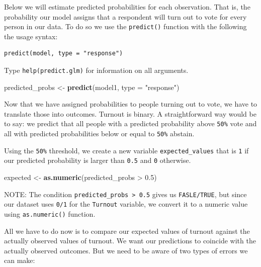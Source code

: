 \documentclass[]{article}
\newenvironment{Shaded}{\begin{snugshade}}{\end{snugshade}}
\newcommand{\KeywordTok}[1]{\textcolor[rgb]{0.13,0.29,0.53}{\textbf{{#1}}}}
\newcommand{\DataTypeTok}[1]{\textcolor[rgb]{0.13,0.29,0.53}{{#1}}}
\newcommand{\FloatTok}[1]{\textcolor[rgb]{0.00,0.00,0.81}{{#1}}}
\newcommand{\StringTok}[1]{\textcolor[rgb]{0.31,0.60,0.02}{{#1}}}
\newcommand{\NormalTok}[1]{{#1}}
\theoremstyle{definition}
\theoremstyle{definition}
\theoremstyle{remark}
\begin{document}
Below we will estimate predicted probabilities for each observation.
That is, the probability our model assigns that a respondent will turn
out to vote for every person in our data. To do so we use the
\texttt{predict()} function with the following the usage syntax:

\begin{verbatim}
predict(model, type = "response")
\end{verbatim}

Type \texttt{help(predict.glm)} for information on all arguments.

\begin{Shaded}
\begin{Highlighting}[]
\NormalTok{predicted_probs <-}\StringTok{ }\KeywordTok{predict}\NormalTok{(model1, }\DataTypeTok{type =} \StringTok{"response"}\NormalTok{)}
\end{Highlighting}
\end{Shaded}

Now that we have assigned probabilities to people turning out to vote,
we have to translate those into outcomes. Turnout is binary. A
straightforward way would be to say: we predict that all people with a
predicted probability above \texttt{50\%} vote and all with predicted
probabilities below or equal to \texttt{50\%} abstain.

Using the \texttt{50\%} threshold, we create a new variable
\texttt{expected\_values} that is \texttt{1} if our predicted
probability is larger than \texttt{0.5} and \texttt{0} otherwise.

\begin{Shaded}
\begin{Highlighting}[]
\NormalTok{expected <-}\StringTok{ }\KeywordTok{as.numeric}\NormalTok{(predicted_probs >}\StringTok{ }\FloatTok{0.5}\NormalTok{)}
\end{Highlighting}
\end{Shaded}

NOTE: The condition \texttt{predicted\_probs\ \textgreater{}\ 0.5} gives
us \texttt{FASLE/TRUE}, but since our dataset uses \texttt{0/1} for the
\texttt{Turnout} variable, we convert it to a numeric value using
\texttt{as.numeric()} function.

All we have to do now is to compare our expected values of turnout
against the actually observed values of turnout. We want our predictions
to coincide with the actually observed outcomes. But we need to be aware
of two types of errors we can make:
\end{document}
